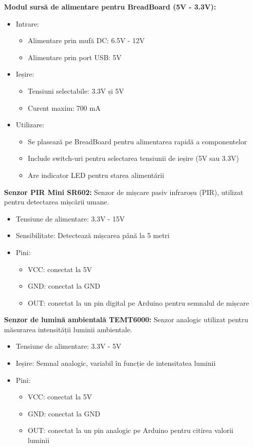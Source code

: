 \documentclass[a4paper,12pt]{report}
\begin{document}
\textbf{Modul sursă de alimentare pentru BreadBoard (5V - 3.3V):}
\begin{itemize}
    \item Intrare:
    \begin{itemize}
        \item Alimentare prin mufă DC: 6.5V - 12V
        \item Alimentare prin port USB: 5V
    \end{itemize}
    \item Ieșire:
    \begin{itemize}
        \item Tensiuni selectabile: 3.3V și 5V
        \item Curent maxim: 700 mA
    \end{itemize}
    \item Utilizare:
    \begin{itemize}
        \item Se plasează pe BreadBoard pentru alimentarea rapidă a componentelor
        \item Include switch-uri pentru selectarea tensiunii de ieșire (5V sau 3.3V)
        \item Are indicator LED pentru starea alimentării
    \end{itemize}
\end{itemize}

\textbf{Senzor PIR Mini SR602:} Senzor de mișcare pasiv infraroșu (PIR), utilizat pentru detectarea mișcării umane.
\begin{itemize}
    \item Tensiune de alimentare: 3.3V - 15V
    \item Sensibilitate: Detectează mișcarea până la 5 metri
    \item Pini:
    \begin{itemize}
        \item VCC: conectat la 5V
        \item GND: conectat la GND
        \item OUT: conectat la un pin digital pe Arduino pentru semnalul de mișcare
    \end{itemize}
\end{itemize}

\textbf{Senzor de lumină ambientală TEMT6000:} Senzor analogic utilizat pentru măsurarea intensității luminii ambientale.
\begin{itemize}
    \item Tensiune de alimentare: 3.3V - 5V
    \item Ieșire: Semnal analogic, variabil în funcție de intensitatea luminii
    \item Pini:
    \begin{itemize}
        \item VCC: conectat la 5V
        \item GND: conectat la GND
        \item OUT: conectat la un pin analogic pe Arduino pentru citirea valorii luminii
    \end{itemize}
\end{itemize}
\end{document}
